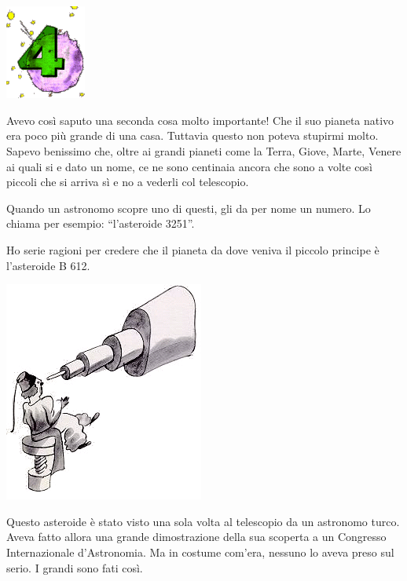 \documentclass[11pt]{scrbook}
\begin{document}
\chapter{}
\begin{center}
\includegraphics{img/chapter4}
\end{center}

Avevo così saputo una seconda cosa molto importante! Che il suo pianeta
nativo era poco più grande di una casa. Tuttavia questo non poteva
stupirmi molto. Sapevo benissimo che, oltre ai grandi pianeti come la
Terra, Giove, Marte, Venere ai quali si e dato un nome, ce ne sono
centinaia ancora che sono a volte così piccoli che si arriva sì e no a
vederli col telescopio.

Quando un astronomo scopre uno di questi, gli da per nome un numero. Lo
chiama per esempio: ``l'asteroide 3251''.

Ho serie ragioni per credere che il pianeta da dove veniva il piccolo
principe è l'asteroide B 612.

\begin{center}
\includegraphics{img/4b}

\end{center}

Questo asteroide è stato visto una sola volta al telescopio da un
astronomo turco. Aveva fatto allora una grande dimostrazione della sua
scoperta a un Congresso Internazionale d'Astronomia. Ma in costume
com'era, nessuno lo aveva preso sul serio. I grandi sono fati così.
\end{document}
